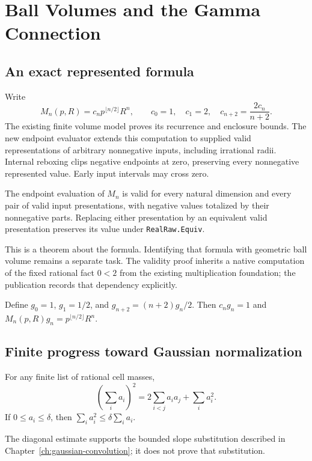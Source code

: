 \chapter{Ball Volumes and the Gamma Connection}\label{ch:n-ball-gamma}

\section{An exact represented formula}
Write
\[
 M_n(p,R)=c_np^{\lfloor n/2\rfloor}R^n,\qquad
 c_0=1,\quad c_1=2,\quad c_{n+2}=\frac{2c_n}{n+2}.
\]
The existing finite volume model proves its recurrence and enclosure bounds.
The new endpoint evaluator extends this computation to supplied valid
representations of arbitrary nonnegative inputs, including irrational radii.
Internal reboxing clips negative endpoints at zero, preserving every
nonnegative represented value. Early input intervals may cross zero.

\begin{theorem}
\label{thm:n-ball-represented}
The endpoint evaluation of $M_n$ is valid for every natural dimension and
every pair of valid input presentations, with negative values totalized by
their nonnegative parts. Replacing either presentation by an equivalent
valid presentation preserves its
value under \texttt{RealRaw.Equiv}.
\leanok
\end{theorem}

This is a theorem about the formula. Identifying that formula with geometric
ball volume remains a separate task. The validity proof inherits a native
computation of the fixed rational fact $0<2$ from the existing multiplication
foundation; the publication records that dependency explicitly.

\begin{theorem}
\label{thm:n-ball-gamma-coefficients}
Define $g_0=1$, $g_1=1/2$, and $g_{n+2}=(n+2)g_n/2$. Then
$c_ng_n=1$ and $M_n(p,R)g_n=p^{\lfloor n/2\rfloor}R^n$.
\leanok
\end{theorem}

\section{Finite progress toward Gaussian normalization}
\begin{theorem}
\label{thm:gaussian-square-diagonal}
For any finite list of rational cell masses,
\[
 (\sum_i a_i)^2=2\sum_{i<j}a_ia_j+\sum_i a_i^2.
\]
If $0\le a_i\le\delta$, then $\sum_i a_i^2\le\delta\sum_i a_i$.
\leanok
\end{theorem}
The diagonal estimate supports the bounded slope substitution described in
Chapter~\ref{ch:gaussian-convolution}; it does not prove that substitution.

